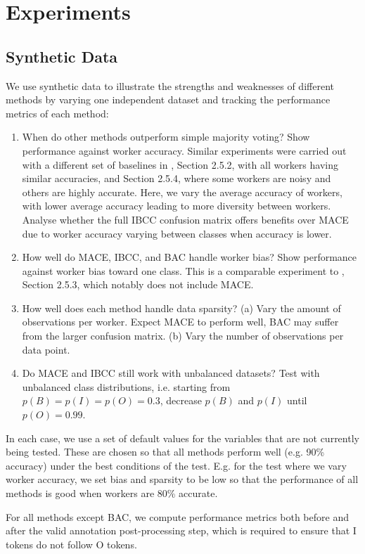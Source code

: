 \section{Experiments}

\subsection{Synthetic Data}

We use synthetic data to illustrate the strengths and weaknesses of different methods by varying one independent
dataset and tracking the performance metrics of each method:
\begin{enumerate}
  \item When do other methods outperform simple majority voting? Show performance against worker accuracy.
  Similar experiments were carried out with a different set of baselines in \cite{Simpson2014Thesis}, Section 2.5.2, with all workers having similar accuracies, and Section 2.5.4, where some workers are noisy and others are highly accurate. Here, we vary the average accuracy of workers, with lower average accuracy leading to more diversity between workers. Analyse whether the full IBCC confusion matrix offers benefits over MACE due to worker accuracy varying between classes when accuracy is lower. 
  \item How well do MACE, IBCC, and BAC handle worker bias? Show performance against worker bias toward one class. This is a comparable experiment to \cite{Simpson2014Thesis}, Section 2.5.3, which notably does not include MACE.
  \item How well does each method handle data sparsity? (a) Vary the amount of observations per worker. Expect MACE to perform well, BAC may suffer from the larger confusion matrix. (b) Vary the number of observations per data point. 
  \item Do MACE and IBCC still work with unbalanced datasets? Test with unbalanced class distributions, i.e. starting from $p(B) = p(I) = p(O) = 0.3$, decrease
  $p(B)$ and $p(I)$ until $p(O) = 0.99$.
\end{enumerate}
In each case, we use a set of default values for the variables that are not currently being tested. These are
 chosen so that all methods perform well (e.g. 90\% accuracy) under the best conditions of the test. E.g. for the test where we vary worker accuracy, we set bias and sparsity to be low so that the performance of all methods is good when workers are 80\% accurate.

For all methods except BAC, we compute performance metrics both before and after the valid annotation post-processing step, which is required to ensure that I tokens do not follow O tokens.

